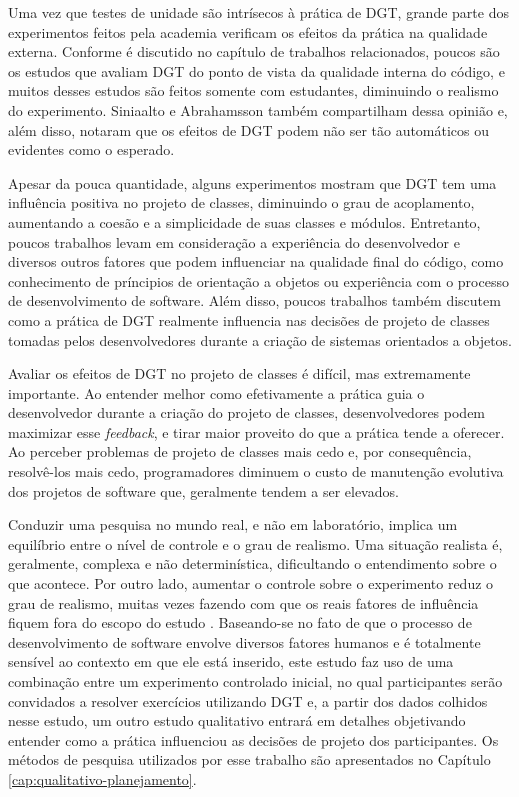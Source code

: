 Uma vez que testes de unidade são intrísecos à prática de DGT, 
grande parte dos experimentos feitos pela academia verificam os
efeitos da prática na qualidade externa. Conforme é discutido no capítulo de
trabalhos relacionados, poucos são os estudos que avaliam DGT do
ponto de vista da qualidade interna do código, e muitos desses estudos
são feitos somente com estudantes, diminuindo o realismo do experimento. 
Siniaalto e Abrahamsson \cite{alarming-results} também
compartilham dessa opinião e, além disso, notaram que os efeitos de DGT podem 
não ser tão automáticos ou evidentes como o esperado.

Apesar da pouca quantidade, alguns experimentos mostram que DGT tem uma influência
positiva no projeto de classes, diminuindo o grau de acoplamento, aumentando
a coesão e a simplicidade de suas classes e módulos. Entretanto, poucos trabalhos
levam em consideração a experiência do desenvolvedor e diversos
outros fatores que podem influenciar na qualidade final do código, como conhecimento
de príncipios de orientação a objetos ou experiência com o processo de 
desenvolvimento de software. Além disso, poucos trabalhos também discutem como
a prática de DGT realmente influencia 
nas decisões de projeto de classes tomadas pelos desenvolvedores durante a criação de sistemas 
orientados a objetos.

Avaliar os efeitos de DGT no projeto de classes é difícil, mas extremamente importante.
Ao entender melhor como efetivamente a prática guia o desenvolvedor durante
a criação do projeto de classes, desenvolvedores podem maximizar esse \textit{feedback},
e tirar maior proveito do que a prática tende a oferecer. Ao perceber 
problemas de projeto de classes mais cedo e, por consequência, resolvê-los
mais cedo, programadores diminuem o custo de manutenção evolutiva dos projetos
de software que, geralmente tendem a ser elevados.

Conduzir uma pesquisa no mundo real, e não em laboratório, 
implica um equilíbrio entre o nível de controle
e o grau de realismo. Uma situação realista é, geralmente, complexa e 
não determinística, dificultando o entendimento sobre o que acontece. Por outro
lado, aumentar o controle sobre o experimento reduz o grau de realismo, muitas
vezes fazendo com que os reais fatores de influência fiquem fora do escopo do 
estudo \cite{guidelines-case-study}.
Baseando-se no fato de que o processo de desenvolvimento de software envolve 
diversos fatores humanos e é totalmente sensível ao contexto em que ele está 
inserido, 
este estudo faz uso de uma combinação entre um experimento controlado inicial, 
no qual participantes serão convidados a resolver exercícios utilizando DGT e, 
a partir dos dados colhidos nesse estudo, um outro estudo qualitativo entrará em 
detalhes objetivando entender como a prática influenciou as decisões de projeto 
dos participantes. Os métodos de pesquisa utilizados por
esse trabalho são apresentados no Capítulo \ref{cap:qualitativo-planejamento}.

